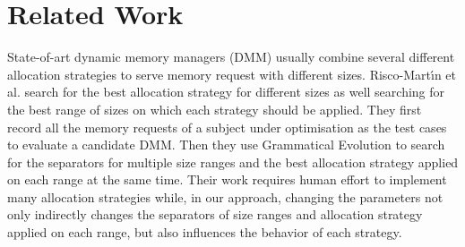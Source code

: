 \section{Related Work}

State-of-art dynamic memory managers (DMM) usually combine several different allocation strategies to serve memory request with different sizes. Risco-Mart\'{\i}n et al. \cite{RiscoMartín2014109, Colmenar:2011:MOD:2001576.2001820} search for the best allocation strategy for different sizes as well searching for the best range of sizes on which each strategy should be applied. They first record all the memory requests of a subject under optimisation as the test cases to evaluate a candidate DMM. Then they use Grammatical Evolution to search for the separators for multiple size ranges and the best allocation strategy applied on each range at the same time. Their work requires human effort to implement many allocation strategies while, in our approach, changing the parameters not only indirectly changes the separators of size ranges and allocation strategy applied on each range, but also influences the behavior of each strategy.



